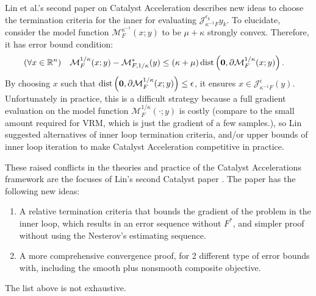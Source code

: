 \documentclass[12pt]{article}
\begin{document}
            \par 
            Lin et al.'s second paper on Catalyst Acceleration \cite{lin_catalyst_2018} describes new ideas to choose the termination criteria for the inner for evaluating $\mathcal J_{\kappa^{-1}F}^{\epsilon_k} y_k$. 
            To elucidate, consider the model function $\mathcal M_F^{\kappa^{-1}}(x; y)$ to be $\mu + \kappa$ strongly convex. 
            Therefore, it has error bound condition: 
            \begin{align*}
                (\forall x\in \mathbb R^n) \quad 
                \mathcal M^{1/\kappa}_F(x; y) -
                \mathcal M_{F, 1/\kappa}^*(y) 
                &\le (\kappa + \mu)\operatorname{dist}
                    \left(
                        \mathbf 0, \partial \mathcal M^{1/\kappa}_F(x; y)
                    \right). 
            \end{align*}
            By choosing $x$ such that $\operatorname{dist}\left(\mathbf 0, \partial \mathcal M_F^{1/\kappa}(x; y)\right) \le \epsilon$, it ensures $x \in \mathcal J^\epsilon_{\kappa^{-1}F}(y)$. 
            Unfortunately in practice, this is a difficult strategy because a full gradient evaluation on the model function $\mathcal M^{1/\kappa}_F(\cdot; y)$ is costly (compare to the small amount required for VRM, which is just the gradient of a few samples.), so Lin suggested alternatives of inner loop termination criteria, and/or upper bounds of inner loop iteration to make Catalyst Acceleration competitive in practice. 
            \par
            \par 
            These raised conflicts in the theories and practice of the Catalyst Accelerations framework are the focuses of Lin's second Catalyst paper \cite{lin_catalyst_2018}. 
            The paper has the following new ideas: 
            \begin{enumerate}
                \item A relative termination criteria that bounds the gradient of the problem in the inner loop, which results in an error sequence without $F^*$, and simpler proof without using the Nesterov's estimating sequence. 
                \item A more comprehensive convergence proof, for 2 different type of error bounds with, including the smooth plus nonsmooth composite objective. 
            \end{enumerate}
            The list above is not exhaustive. 
\end{document}
